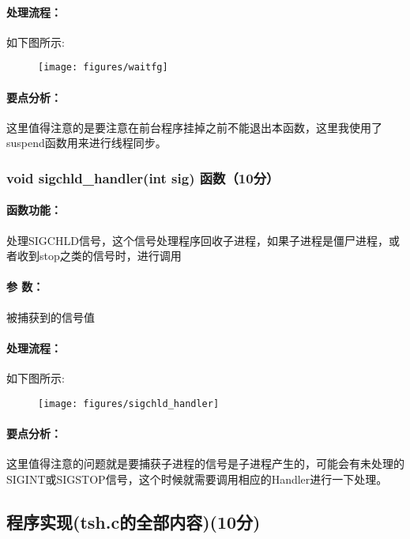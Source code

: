 \paragraph{处理流程：}如下图所示:
\begin{figure}[H]
    \centering 
    \texttt{[image: figures/waitfg]}
\end{figure}
\paragraph{要点分析：}这里值得注意的是要注意在前台程序挂掉之前不能退出本函数，这里我使用了suspend函数用来进行线程同步。

\subsubsection{void sigchld\_handler(int sig) 函数（10分）}

\paragraph{函数功能：}处理SIGCHLD信号，这个信号处理程序回收子进程，如果子进程是僵尸进程，或者收到stop之类的信号时，进行调用
\paragraph{参   数：}被捕获到的信号值
\paragraph{处理流程：}如下图所示:
\begin{figure}[H]
    \centering 
    \texttt{[image: figures/sigchld\_handler]}
\end{figure}
\paragraph{要点分析：}这里值得注意的问题就是要捕获子进程的信号是子进程产生的，可能会有未处理的SIGINT或SIGSTOP信号，这个时候就需要调用相应的Handler进行一下处理。

\subsection{程序实现(tsh.c的全部内容)(10分)}
\inputminted{c}{../../../Experiment6/tsh.c}
